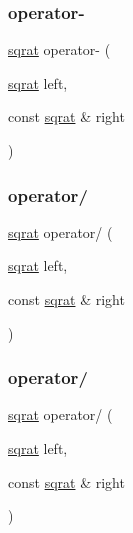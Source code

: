 \mbox{\label{classsqrat_a78bb0ea9bd5a4282ba33a61c4bc073b6}} 
\subsubsection{\texorpdfstring{operator-\/}{operator-}\hspace{0.1cm}{\footnotesize\ttfamily [4/4]}}
{\footnotesize\ttfamily \mbox{\hyperlink{classsqrat}{sqrat}} operator-\/ (\begin{DoxyParamCaption}\item[{\mbox{\hyperlink{classsqrat}{sqrat}}}]{left,  }\item[{const \mbox{\hyperlink{classsqrat}{sqrat}} \&}]{right }\end{DoxyParamCaption})\hspace{0.3cm}{\ttfamily [friend]}}

\mbox{\label{classsqrat_aa6e76248a9ec776743e60e5db8b3cb6d}} 
\subsubsection{\texorpdfstring{operator/}{operator/}\hspace{0.1cm}{\footnotesize\ttfamily [1/2]}}
{\footnotesize\ttfamily \mbox{\hyperlink{classsqrat}{sqrat}} operator/ (\begin{DoxyParamCaption}\item[{\mbox{\hyperlink{classsqrat}{sqrat}}}]{left,  }\item[{const \mbox{\hyperlink{classsqrat}{sqrat}} \&}]{right }\end{DoxyParamCaption})\hspace{0.3cm}{\ttfamily [friend]}}

\mbox{\label{classsqrat_aa6e76248a9ec776743e60e5db8b3cb6d}} 
\subsubsection{\texorpdfstring{operator/}{operator/}\hspace{0.1cm}{\footnotesize\ttfamily [2/2]}}
{\footnotesize\ttfamily \mbox{\hyperlink{classsqrat}{sqrat}} operator/ (\begin{DoxyParamCaption}\item[{\mbox{\hyperlink{classsqrat}{sqrat}}}]{left,  }\item[{const \mbox{\hyperlink{classsqrat}{sqrat}} \&}]{right }\end{DoxyParamCaption})\hspace{0.3cm}{\ttfamily [friend]}}


